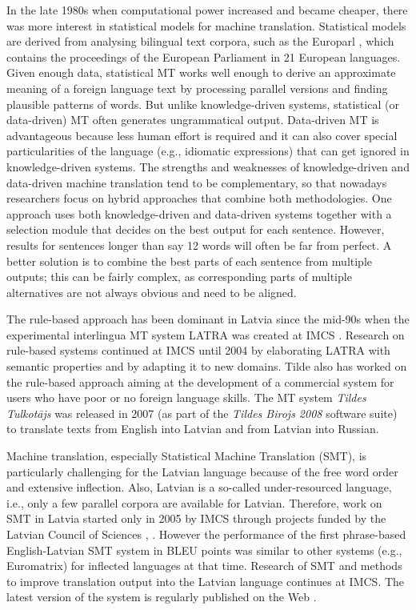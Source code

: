 \begin{multicols}{2}
In the late 1980s when computational power increased and became cheaper, there was more interest in statistical models for machine translation.
Statistical models are derived from analysing bilingual text corpora, such as the Europarl , which contains the proceedings of the European Parliament in 21 European languages.
Given enough data, statistical MT works well enough to derive an approximate meaning of a foreign language text by processing parallel versions and finding plausible patterns of words.
But unlike knowledge-driven systems, statistical (or data-driven) MT often generates ungrammatical output.
Data-driven MT is advantageous because less human effort is required and it can also cover special particularities of the language (e.g., idiomatic expressions) that can get ignored in knowledge-driven systems.
\textbf{}
The strengths and weaknesses of knowledge-driven and data-driven machine translation tend to be complementary, so that nowadays researchers focus on hybrid approaches that combine both methodologies.
One approach uses both knowledge-driven and data-driven systems together with a selection module that decides on the best output for each sentence.
However, results for sentences longer than say 12 words will often be far from perfect.
A better solution is to combine the best parts of each sentence from multiple outputs; this can be fairly complex, as corresponding parts of multiple alternatives are not always obvious and need to be aligned. 

The rule-based approach has been dominant in Latvia since the mid-90s when the experimental interlingua MT system LATRA was created at IMCS \cite{Meta23}.
Research on rule-based systems continued at IMCS until 2004 by elaborating LATRA with semantic properties and by adapting it to new domains.
Tilde also has worked on the rule-based approach aiming at the development of a commercial system for users who have poor or no foreign language skills.
The MT system \textit{Tildes Tulkotājs} \cite{Meta24} was released in 2007 (as part of the \textit{Tildes Birojs 2008} software suite) to translate texts from English into Latvian and from Latvian into Russian. 

Machine translation, especially Statistical Machine Translation (SMT), is particularly challenging for the Latvian language because of the free word order and extensive inflection.
Also, Latvian is a so-called under-resourced language, i.e., only a few parallel corpora are available for Latvian.
Therefore, work on SMT in Latvia started only in 2005 by IMCS through projects funded by the Latvian Council of Sciences \cite{Meta25}, \cite{Meta26}.
However the performance of the first phrase-based English-Latvian SMT system in BLEU points was similar to other systems (e.g., Euromatrix) for inflected languages at that time.
Research of SMT and methods to improve translation output into the Latvian language continues at IMCS.
The latest version of the system is regularly published on the Web \cite{Meta27}.


\end{multicols}
